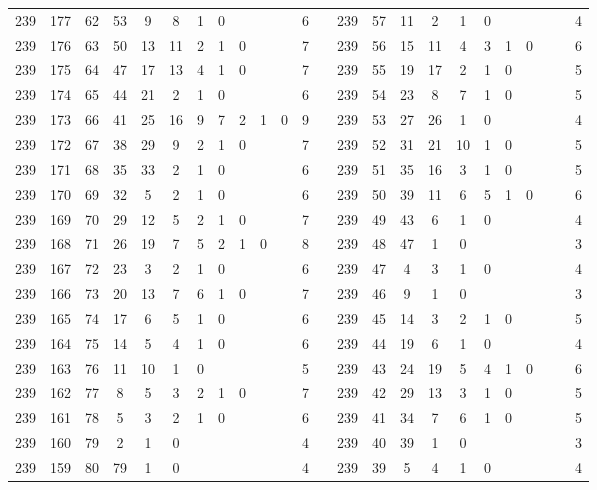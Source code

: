 {\begin{tabular}{@{}cccccccccccclccccccccccc@{}}
239 & 177 & 62 & 53 & 9 & 8 & 1 & 0 &  &  &  & 6 &  & 239 & 57 & 11 & 2 & 1 & 0 &  &  &  &  & 4 \\
239 & 176 & 63 & 50 & 13 & 11 & 2 & 1 & 0 &  &  & 7 &  & 239 & 56 & 15 & 11 & 4 & 3 & 1 & 0 &  &  & 6 \\
239 & 175 & 64 & 47 & 17 & 13 & 4 & 1 & 0 &  &  & 7 &  & 239 & 55 & 19 & 17 & 2 & 1 & 0 &  &  &  & 5 \\
239 & 174 & 65 & 44 & 21 & 2 & 1 & 0 &  &  &  & 6 &  & 239 & 54 & 23 & 8 & 7 & 1 & 0 &  &  &  & 5 \\
239 & 173 & 66 & 41 & 25 & 16 & 9 & 7 & 2 & 1 & 0 & 9 &  & 239 & 53 & 27 & 26 & 1 & 0 &  &  &  &  & 4 \\
239 & 172 & 67 & 38 & 29 & 9 & 2 & 1 & 0 &  &  & 7 &  & 239 & 52 & 31 & 21 & 10 & 1 & 0 &  &  &  & 5 \\
239 & 171 & 68 & 35 & 33 & 2 & 1 & 0 &  &  &  & 6 &  & 239 & 51 & 35 & 16 & 3 & 1 & 0 &  &  &  & 5 \\
239 & 170 & 69 & 32 & 5 & 2 & 1 & 0 &  &  &  & 6 &  & 239 & 50 & 39 & 11 & 6 & 5 & 1 & 0 &  &  & 6 \\
239 & 169 & 70 & 29 & 12 & 5 & 2 & 1 & 0 &  &  & 7 &  & 239 & 49 & 43 & 6 & 1 & 0 &  &  &  &  & 4 \\
239 & 168 & 71 & 26 & 19 & 7 & 5 & 2 & 1 & 0 &  & 8 &  & 239 & 48 & 47 & 1 & 0 &  &  &  &  &  & 3 \\
239 & 167 & 72 & 23 & 3 & 2 & 1 & 0 &  &  &  & 6 &  & 239 & 47 & 4 & 3 & 1 & 0 &  &  &  &  & 4 \\
239 & 166 & 73 & 20 & 13 & 7 & 6 & 1 & 0 &  &  & 7 &  & 239 & 46 & 9 & 1 & 0 &  &  &  &  &  & 3 \\
239 & 165 & 74 & 17 & 6 & 5 & 1 & 0 &  &  &  & 6 &  & 239 & 45 & 14 & 3 & 2 & 1 & 0 &  &  &  & 5 \\
239 & 164 & 75 & 14 & 5 & 4 & 1 & 0 &  &  &  & 6 &  & 239 & 44 & 19 & 6 & 1 & 0 &  &  &  &  & 4 \\
239 & 163 & 76 & 11 & 10 & 1 & 0 &  &  &  &  & 5 &  & 239 & 43 & 24 & 19 & 5 & 4 & 1 & 0 &  &  & 6 \\
239 & 162 & 77 & 8 & 5 & 3 & 2 & 1 & 0 &  &  & 7 &  & 239 & 42 & 29 & 13 & 3 & 1 & 0 &  &  &  & 5 \\
239 & 161 & 78 & 5 & 3 & 2 & 1 & 0 &  &  &  & 6 &  & 239 & 41 & 34 & 7 & 6 & 1 & 0 &  &  &  & 5 \\
239 & 160 & 79 & 2 & 1 & 0 &  &  &  &  &  & 4 &  & 239 & 40 & 39 & 1 & 0 &  &  &  &  &  & 3 \\
239 & 159 & 80 & 79 & 1 & 0 &  &  &  &  &  & 4 &  & 239 & 39 & 5 & 4 & 1 & 0 &  &  &  &  & 4 \\ \bottomrule
\end{tabular}%
}


